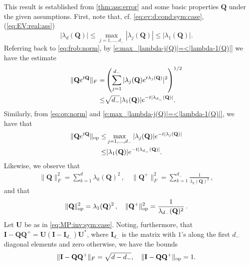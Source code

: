 \documentclass[9pt,twocolumn,twoside]{pnas-new}
\newcommand{\?}{\textbf{?}}
\newcommand{\op}{\textnormal{op}}
\newcommand{\QQ}{\mathbf{Q}}
\newcommand{\II}{\mathbf{I}}
\newcommand{\UU}{\mathbf{U}}
\begin{document}
This result is established from \cref{thm:ass:error} and some basic
properties $\QQ$ under the given assumptions. First, note that, cf.
\eqref{eq:ev:d:cond:sym:case}, (\ref{eq:EV:real:ass})
\begin{equation}\label{e:max_|lambda-j(Q)|=<|lambda-1(Q)|}
  |\lambda_d(\QQ)| \leq \max_{j =1, \ldots,d_{-}} |\lambda_{j}(\QQ)| \leq |\lambda_1(\QQ)|.
\end{equation}
Referring back to
\eqref{eq:frob:norm}, by \eqref{e:max_|lambda-j(Q)|=<|lambda-1(Q)|} we have the estimate
\begin{align}\label{eq:frob:sucks}
  \| \QQ e^{t\QQ} \|_F
  =&  \left( \sum_{j =1}^{d_{-}}
     | \lambda_j(\QQ) e^{ t  \lambda_j(\QQ)  } |^2 \right)^{1/2}
     \notag\\
  \leq& \sqrt{d_{-}} |\lambda_{1}(\QQ)| e^{-t |\lambda_{d_{-}}(\QQ)|}.
\end{align}
Similarly, from \eqref{eq:op:norm} and \eqref{e:max_|lambda-j(Q)|=<|lambda-1(Q)|}, we have that
\begin{align}\label{eq:op:better}
  \| \QQ e^{t\QQ} \|_{\op}
  \leq& \max_{j =1, \ldots,d_{-}}
        |\lambda_{j}(\QQ)| e^{-t |\lambda_{j}(\QQ)|}
        \notag\\
  \leq& |\lambda_{1}(\QQ)| e^{-t |\lambda_{d_{-}}(\QQ)|}.
\end{align}
Likewise, we observe that
\begin{align}\label{eq:thm1:extra:trms:1:F}
  \lVert \QQ\rVert^2_F = \sum_{k=1}^{d} \lambda_k(\QQ)^2 \, , \quad
  \lVert \QQ^+ \rVert^2_F = \sum_{k =1}^{d_-}\frac{1}{\lambda_k(\QQ)^2} \, ,
\end{align}
and that
\begin{align}\label{eq:thm1:extra:trms:1:F}
  \lVert \QQ\rVert^2_{\op} = \lambda_1(\QQ)^2 \, , \quad
  \lVert \QQ^+ \rVert^2_{\op} = \frac{1}{\lambda_{d_{-}}(\QQ)^2} \,.
\end{align}
Let $\UU$ be as in \eqref{eq:MP:inv:sym:case}. Noting, furthermore,
that $\II - \QQ \QQ^+ = \UU(\II - \II_{d_-})\UU^*$, where $\II_{d_-}$
is the matrix with $1$'s along the first $d_-$ diagonal elements and
zero otherwise, we have the bounds
\begin{align}\label{eq:proj:mat:bnds}
  \|\II - \QQ  \QQ^+\|_{F} = \sqrt{d - d_{-}},
  \quad
  \| \II - \QQ  \QQ^+\|_{\op} = 1.
\end{align}
\end{document}

